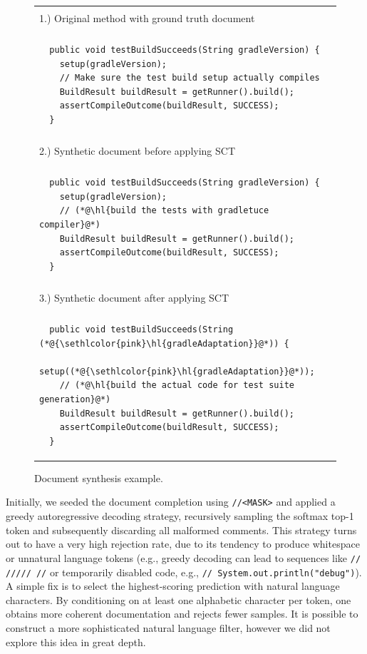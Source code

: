 \documentclass[usenames,dvipsnames]{article} %
\DeclareRobustCommand{\hlred}[1]{{\sethlcolor{pink}\hl{#1}}}
\begin{document}
  \begin{figure}[H]
    \begin{center}
      \begin{tabular}{|p{9cm}|}
        \hline\\[-1em]1.) Original method with ground truth document \\[-1em]\\\hline
        \begin{lstlisting}
  public void testBuildSucceeds(String gradleVersion) {
    setup(gradleVersion);
    // Make sure the test build setup actually compiles
    BuildResult buildResult = getRunner().build();
    assertCompileOutcome(buildResult, SUCCESS);
  }
        \end{lstlisting}
        \\\hline\\[-1em]2.) Synthetic document before applying SCT \\[-1em]\\\hline
        \begin{lstlisting}
  public void testBuildSucceeds(String gradleVersion) {
    setup(gradleVersion);
    // (*@\hl{build the tests with gradletuce compiler}@*)
    BuildResult buildResult = getRunner().build();
    assertCompileOutcome(buildResult, SUCCESS);
  }
        \end{lstlisting}
        \\\hline\\[-1em]3.) Synthetic document after applying SCT \\[-1em]\\\hline
        \begin{lstlisting}
  public void testBuildSucceeds(String (*@\hlred{gradleAdaptation}@*)) {
    setup((*@\hlred{gradleAdaptation}@*));
    // (*@\hl{build the actual code for test suite generation}@*)
    BuildResult buildResult = getRunner().build();
    assertCompileOutcome(buildResult, SUCCESS);
  }
        \end{lstlisting}\\\hline
      \end{tabular}
    \end{center}
    \caption{Document synthesis example.}
    \label{fig:document_synthesis}
  \end{figure}

  Initially, we seeded the document completion using \lstinline|//<MASK>| and applied a greedy autoregressive decoding strategy, recursively sampling the softmax top-1 token and subsequently discarding all malformed comments. This strategy turns out to have a very high rejection rate, due to its tendency to produce whitespace or unnatural language tokens (e.g., greedy decoding can lead to sequences like \lstinline|// ///// //| or temporarily disabled code, e.g., \lstinline|// System.out.println("debug")|). A simple fix is to select the highest-scoring prediction with natural language characters. By conditioning on at least one alphabetic character per token, one obtains more coherent documentation and rejects fewer samples. It is possible to construct a more sophisticated natural language filter, however we did not explore this idea in great depth.
\end{document}
